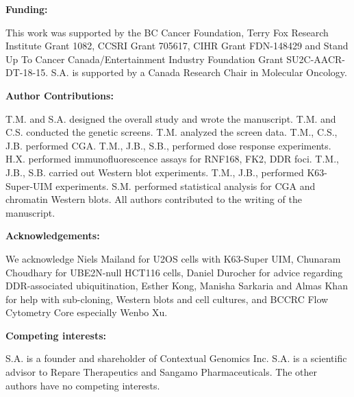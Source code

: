 \textbf{Funding:  }

This work was supported by the BC Cancer Foundation, Terry Fox Research Institute Grant 1082, CCSRI Grant 705617, CIHR Grant FDN-148429 and Stand Up To Cancer Canada/Entertainment Industry Foundation Grant SU2C-AACR-DT-18-15. S.A. is supported by a Canada Research Chair in Molecular Oncology.

\textbf{Author Contributions:  }

T.M. and S.A. designed the overall study and wrote the manuscript. T.M. and C.S. conducted the genetic screens. T.M. analyzed the screen data. T.M., C.S., J.B. performed CGA. T.M., J.B., S.B., performed dose response experiments. H.X. performed immunofluorescence assays for RNF168, FK2, DDR foci. T.M., J.B., S.B. carried out Western blot experiments. T.M., J.B., performed K63-Super-UIM experiments. S.M. performed statistical analysis for CGA and chromatin Western blots. All authors contributed to the writing of the manuscript.    

\textbf{Acknowledgements:  }

We acknowledge Niels Mailand for U2OS cells with K63-Super UIM, Chunaram Choudhary for UBE2N-null HCT116 cells, Daniel Durocher for advice regarding DDR-associated ubiquitination, Esther Kong, Manisha Sarkaria and Almas Khan for help with sub-cloning, Western blots and cell cultures, and BCCRC Flow Cytometry Core especially Wenbo Xu.

\textbf{Competing interests:  }

S.A. is a founder and shareholder of Contextual Genomics Inc. S.A. is a scientific advisor to Repare Therapeutics and Sangamo Pharmaceuticals. The other authors have no competing interests.

